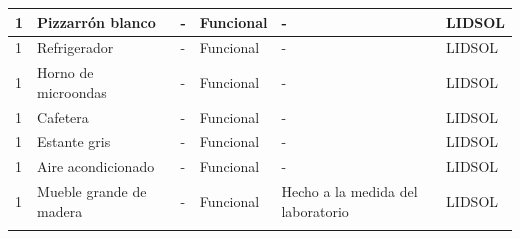 \documentclass[a4paper,11pt]{article}                 %
\begin{document}
\begin{longtable}{|p{}|p{}|p{}|p{}|p{}|p{}|}
1                          & Pizzarrón blanco           & -                                                                            & Funcional                & -                                                                          & LIDSOL                        \\ \hline
1                          & Refrigerador               & -                                                                            & Funcional                & -                                                                          & LIDSOL                        \\ \hline
1                          & Horno de microondas        & -                                                                            & Funcional                & -                                                                          & LIDSOL                        \\ \hline
1                          & Cafetera                   & -                                                                            & Funcional                & -                                                                          & LIDSOL                        \\ \hline
1                          & Estante gris               & -                                                                            & Funcional                & -                                                                          & LIDSOL                        \\ \hline
1                          & Aire acondicionado         & -                                                                            & Funcional                & -                                                                          & LIDSOL                        \\ \hline
1                          & Mueble grande de madera    & -                                                                            & Funcional                & Hecho a la medida del laboratorio                                          & LIDSOL                        \\ \hline
\multicolumn{6}{|l|}{\cellcolor[HTML]{EFEFEF}{\color[HTML]{343434} Externo}}                                                                                                                                                                                                                                                                      \\ \hline

\end{longtable}
\end{document}
